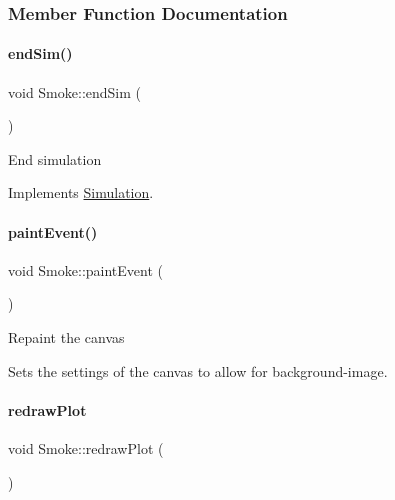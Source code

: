 \subsubsection{Member Function Documentation}
\mbox{\label{classSmoke_a83d3a0d8bf172fcd6bc42ebf07f0f12f}} 
\paragraph{\texorpdfstring{endSim()}{endSim()}}
{\footnotesize\ttfamily void Smoke\+::end\+Sim (\begin{DoxyParamCaption}{ }\end{DoxyParamCaption})\hspace{0.3cm}{\ttfamily [virtual]}}

End simulation 

Implements \mbox{\hyperlink{classSimulation_ab496d124202f55e741db7db9a304a7ee}{Simulation}}.

\mbox{\label{classSmoke_af00f430e6cbe30b6caf841d7d1b05890}} 
\paragraph{\texorpdfstring{paintEvent()}{paintEvent()}}
{\footnotesize\ttfamily void Smoke\+::paint\+Event (\begin{DoxyParamCaption}\item[{Q\+Paint\+Event $\ast$}]{ }\end{DoxyParamCaption})}

Repaint the canvas

Sets the settings of the canvas to allow for background-\/image. \mbox{\label{classSmoke_a558447ca2b067daebfca58a2d8b30f66}} 
\paragraph{\texorpdfstring{redrawPlot}{redrawPlot}}
{\footnotesize\ttfamily void Smoke\+::redraw\+Plot (\begin{DoxyParamCaption}{ }\end{DoxyParamCaption})\hspace{0.3cm}{\ttfamily [slot]}}

